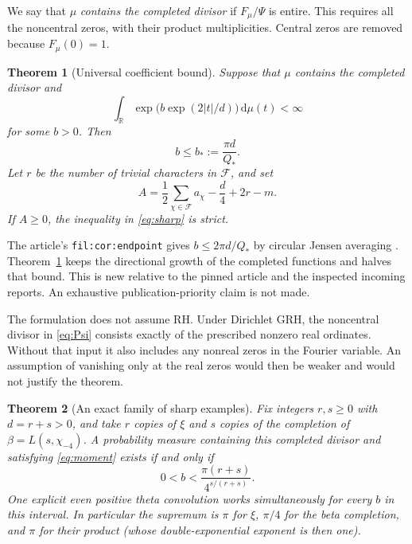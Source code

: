 \documentclass[11pt]{article}
\newtheorem{theorem}{Theorem}[section]
\theoremstyle{remark}\newtheorem{remark}[theorem]{Remark}
\newcommand{\R}{\mathbb R}\newcommand{\C}{\mathbb C}
\newcommand{\dd}{\,\mathrm d}
\begin{document}
We say that $\mu$ \emph{contains the completed divisor} if $F_\mu/\Psi$ is entire. This requires all the noncentral zeros, with their product multiplicities. Central zeros are removed because $F_\mu(0)=1$.

\begin{theorem}[Universal coefficient bound]\label{thm:bound}
Suppose that $\mu$ contains the completed divisor and
\begin{equation}\label{eq:moment}
 \int_\R\exp\bigl(b\exp(2|t|/d)\bigr)\dd\mu(t)<\infty
\end{equation}
for some $b>0$. Then
\begin{equation}\label{eq:sharp}
 \boxed{b\le b_*:=\frac{\pi d}{Q_*}.}
\end{equation}
Let $r$ be the number of trivial characters in $\mathcal F$, and set
\begin{equation}\label{eq:A}
 A=\frac12\sum_{\chi\in\mathcal F}a_\chi-\frac d4+2r-m.
\end{equation}
If $A\ge0$, the inequality in \eqref{eq:sharp} is strict.
\end{theorem}

The article's \texttt{fil:cor:endpoint} gives $b\le2\pi d/Q_*$ by circular Jensen averaging \cite{ProveIt}. Theorem~\ref{thm:bound} keeps the directional growth of the completed functions and halves that bound. This is new relative to the pinned article and the inspected incoming reports. An exhaustive publication-priority claim is not made.

The formulation does not assume RH. Under Dirichlet GRH, the noncentral divisor in \eqref{eq:Psi} consists exactly of the prescribed nonzero real ordinates. Without that input it also includes any nonreal zeros in the Fourier variable. An assumption of vanishing only at the real zeros would then be weaker and would not justify the theorem.

\begin{theorem}[An exact family of sharp examples]\label{thm:examples}
Fix integers $r,s\ge0$ with $d=r+s>0$, and take $r$ copies of $\xi$ and $s$ copies of the completion of $\beta=L(s,\chi_{-4})$. A probability measure containing this completed divisor and satisfying \eqref{eq:moment} exists if and only if
\begin{equation}\label{eq:interval}
 \boxed{0<b<\frac{\pi(r+s)}{4^{s/(r+s)}}.}
\end{equation}
One explicit even positive theta convolution works simultaneously for every $b$ in this interval. In particular the supremum is $\pi$ for $\xi$, $\pi/4$ for the beta completion, and $\pi$ for their product (whose double-exponential exponent is then one).
\end{theorem}
\end{document}

